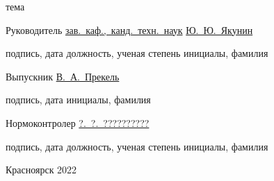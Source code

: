 \begin{spacing}{1}
\begin{centering}
    \end{centering}

    \vspace{-4pt}
    \centerline{\footnotesize тема}

    \vfill
    \vfill
    \vfill

    Руководитель
    \hfill
    \uline{\hspace{10ex}}
    \hspace{3.5ex}
    \uline{зав.~каф.,~канд.~техн.~наук}
    \hspace{2ex}
    \uline{Ю.~Ю.~Якунин}
    \par
    \vspace{-4pt}
    \par
    \hfill
    {\footnotesize подпись, дата}
    \hspace{7.3ex}
    {\footnotesize должность, ученая степень}
    \hspace{6ex}
    {\footnotesize инициалы, фамилия}


    Выпускник
    \hfill
    \uline{\hspace{10ex}}
    \hspace{32ex}
    \uline{В.~А.~Прекель}
    \par
    \vspace{-4pt}
    \par
    \hfill
    {\footnotesize подпись, дата}
    \hspace{32.3ex}
    {\footnotesize инициалы, фамилия}

    Нормоконтролер
    \hfill
    \uline{\hspace{10ex}}
    \hspace{3.5ex}
    \uline{\hspace{24.5ex}}
    \hspace{2ex}
    \uline{?.~?.~??????????}
    \par
    \vspace{-4pt}
    \par
    \hfill
    {\footnotesize подпись, дата}
    \hspace{7.3ex}
    {\footnotesize должность, ученая степень}
    \hspace{6ex}
    {\footnotesize инициалы, фамилия}

    \vfill

    \centerline{Красноярск 2022}

\end{spacing}

\thispagestyle{empty}

\clearpage
